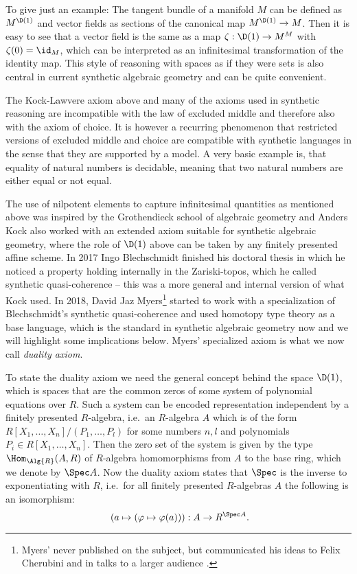 To give just an example: The tangent bundle of a manifold $M$ can be defined as $M^{\D(1)}$ and vector fields as sections of the canonical map $M^{\D(1)}\to M$. Then it is easy to see that a vector field is the same as a map $\zeta:\D(1)\to M^M$ with $\zeta(0)=\id_M$, which can be interpreted as an infinitesimal transformation of the identity map. This style of reasoning with spaces as if they were sets is also central in current synthetic algebraic geometry and can be quite convenient. 

The Kock-Lawvere axiom above and many of the axioms used in synthetic reasoning are incompatible with the law of excluded middle and therefore also with the axiom of choice. It is however a recurring phenomenon that restricted versions of excluded middle and choice are compatible with synthetic languages in the sense that they are supported by a model. A very basic example is, that equality of natural numbers is decidable, meaning that two natural numbers are either equal or not equal. 

The use of nilpotent elements to capture infinitesimal quantities as mentioned above was inspired by the Grothendieck school of algebraic geometry and Anders Kock also worked with an extended axiom \cite{Kock74} suitable for synthetic algebraic geometry, where the role of $\D(1)$ above can be taken by any finitely presented affine scheme. In 2017 Ingo Blechschmidt finished his doctoral thesis in which he noticed a property holding internally in the Zariski-topos, which he called synthetic quasi-coherence -- this was a more general and internal version of what Kock used. In 2018, David Jaz Myers\footnote{Myers' never published on the subject, but communicated his ideas to Felix Cherubini and in talks to a larger audience \cite{myers-talk1,myers-talk2}.} started to work with a specialization of Blechschmidt's synthetic quasi-coherence and used homotopy type theory as a base language, which is the standard in synthetic algebraic geometry now and we will highlight some implications below. Myers' specialized axiom is what we now call \emph{duality axiom}.

To state the duality axiom we need the general concept behind the space $\D(1)$, which is spaces that are the common zeros of some system of polynomial equations over $R$. Such a system can be encoded representation independent by a finitely presented $R$-algebra, i.e.\ an $R$-algebra $A$ which is of the form $R[X_1,\dots,X_n]/(P_1,\dots,P_l)$ for some numbers $n,l$ and polynomials $P_i\in R[X_1,\dots,X_n]$.
Then the zero set of the system is given by the type $\Hom_{\Alg{R}}(A,R)$ of $R$-algebra homomorphisms from $A$ to the base ring, which we denote by $\Spec A$.
Now the duality axiom states that $\Spec$ is the inverse to exponentiating with $R$, i.e.\ for all 
finitely presented $R$-algebras $A$ the following is an isomorphism:
\[ (a\mapsto (\varphi\mapsto \varphi(a))) : A\to R^{\Spec A}\rlap{.}\]

